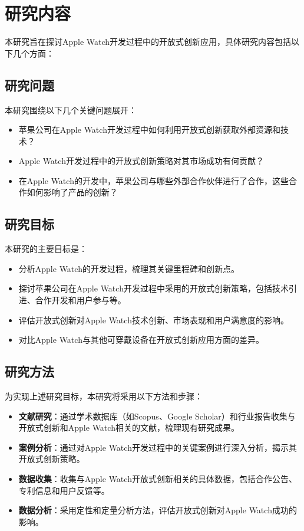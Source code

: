 
\chapter{研究内容}

本研究旨在探讨Apple Watch开发过程中的开放式创新应用，具体研究内容包括以下几个方面：

\section{研究问题}

本研究围绕以下几个关键问题展开：
\begin{itemize}
    \item 苹果公司在Apple Watch开发过程中如何利用开放式创新获取外部资源和技术？
    \item Apple Watch开发过程中的开放式创新策略对其市场成功有何贡献？
    \item 在Apple Watch的开发中，苹果公司与哪些外部合作伙伴进行了合作，这些合作如何影响了产品的创新？
\end{itemize}

\section{研究目标}

本研究的主要目标是：
\begin{itemize}
    \item 分析Apple Watch的开发过程，梳理其关键里程碑和创新点。
    \item 探讨苹果公司在Apple Watch开发过程中采用的开放式创新策略，包括技术引进、合作开发和用户参与等。
    \item 评估开放式创新对Apple Watch技术创新、市场表现和用户满意度的影响。
    \item 对比Apple Watch与其他可穿戴设备在开放式创新应用方面的差异。
\end{itemize}

\section{研究方法}

为实现上述研究目标，本研究将采用以下方法和步骤：
\begin{itemize}
    \item \textbf{文献研究}：通过学术数据库（如Scopus、Google Scholar）和行业报告收集与开放式创新和Apple Watch相关的文献，梳理现有研究成果。
    \item \textbf{案例分析}：通过对Apple Watch开发过程中的关键案例进行深入分析，揭示其开放式创新策略。
    \item \textbf{数据收集}：收集与Apple Watch开放式创新相关的具体数据，包括合作公告、专利信息和用户反馈等。
    \item \textbf{数据分析}：采用定性和定量分析方法，评估开放式创新对Apple Watch成功的影响。
\end{itemize}

